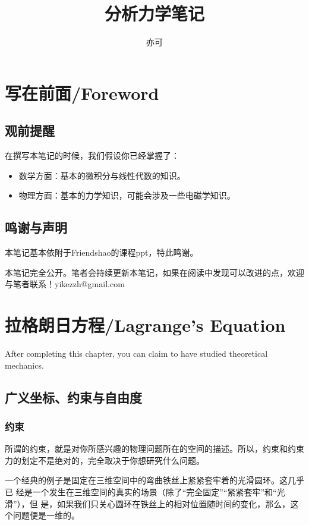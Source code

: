 \documentclass[a4paper, 10pt, openany]{book}%
\begin{document}
  \title{ \heiti 分析力学笔记}
  \author{亦可}
  \maketitle
  
 
\tableofcontents


  \newpage

  \chapter{写在前面/Foreword}


\section{观前提醒}
在撰写本笔记的时候，我们假设你已经掌握了：
\begin{itemize}

\item 数学方面：基本的微积分与线性代数的知识。

\item 物理方面：基本的力学知识，可能会涉及一些电磁学知识。

\end{itemize}
\section{鸣谢与声明}
本笔记基本依附于Friendshao的课程ppt，特此鸣谢。

本笔记完全公开。笔者会持续更新本笔记，如果在阅读中发现可以改进的点，欢迎
与笔者联系！yikezzh@gmail.com

\newpage
\chapter{拉格朗日方程/Lagrange's Equation}
After completing this chapter, you can claim to have studied theoretical mechanics.
\section{广义坐标、约束与自由度}
\subsection{约束}
所谓的约束，就是对你所感兴趣的物理问题所在的空间的描述。所以，约束和约束力的划定不是绝对的，完全取决于你想研究什么问题。

一个经典的例子是固定在三维空间中的弯曲铁丝上紧紧套牢着的光滑圆环。这几乎已
经是一个发生在三维空间的真实的场景（除了“完全固定”“紧紧套牢”和“光滑”），但
是，如果我们只关心圆环在铁丝上的相对位置随时间的变化，那么，这个问题便是一维的。
\end{document}
